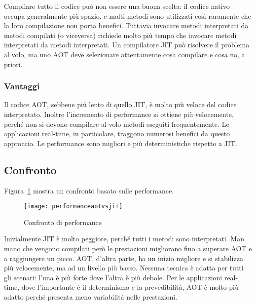 Compilare tutto il codice può non essere una buona scelta: il codice nativo occupa generalmente più spazio, e molti metodi sono utilizzati così raramente che la loro compilazione non porta benefici. Tuttavia invocare metodi interpretati da metodi compilati (o viceversa) richiede molto più tempo che invocare metodi interpretati da metodi interpretati. Un compilatore JIT può risolvere il problema al volo, ma uno AOT deve selezionare attentamente cosa compilare e cosa no, a priori. 

\subsubsection{Vantaggi}
Il codice AOT, sebbene più lento di quello JIT, è molto più veloce del codice interpretato. Inoltre l'incremento di performance si ottiene più velocemente, perché non si devono compilare al volo metodi eseguiti frequentemente. Le applicazioni real-time, in particolare, traggono numerosi benefici da questo approccio. Le performance sono migliori e più deterministiche rispetto a JIT. 

\subsection{Confronto}
Figura~\ref{fig:performanceaotvsjit} mostra un confronto basato sulle performance. 
\begin{figure}[h]
	\centering
	\texttt{[image: performanceaotvsjit]}
	\caption[Confronto di performance]{Confronto di performance}
	\label{fig:performanceaotvsjit}
\end{figure}

Inizialmente JIT è molto peggiore, perché tutti i metodi sono interpretati. Man mano che vengono compilati però le prestazioni migliorano fino a superare AOT e a raggiungere un picco. AOT, d'altra parte, ha un inizio migliore e si stabilizza più velocemente, ma ad un livello più basso. Nessuna tecnica è adatta per tutti gli scenari: l'una è più forte dove l'altra è più debole. Per le applicazioni real-time, dove l'importante è il determinismo e la prevedibilità, AOT è molto più adatto perché presenta meno variabilità nelle prestazioni.